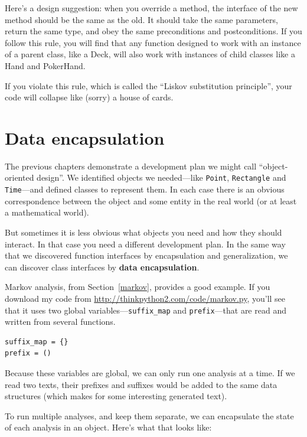 \documentclass[10pt]{book}
\begin{document}
Here's a design suggestion: when you override a method,
the interface of the new method should be the same as the old.  It
should take the same parameters, return the same type, and obey the
same preconditions and postconditions.  If you follow this rule, you
will find that any function designed to work with an instance of a
parent class, like a Deck, will also work with instances of child
classes like a Hand and PokerHand.

If you violate this rule, which is called the ``Liskov substitution
principle'', your code will collapse like (sorry) a house of cards.


\section{Data encapsulation}

The previous chapters demonstrate a development plan we might call
``object-oriented design''.  We identified objects we needed---like
{\tt Point}, {\tt Rectangle} and {\tt Time}---and defined classes to
represent them.  In each case there is an obvious correspondence
between the object and some entity in the real world (or at least a
mathematical world).  

But sometimes it is less obvious what objects you need
and how they should interact.  In that case you need a different
development plan.  In the same way that we discovered function
interfaces by encapsulation and generalization, we can discover
class interfaces by {\bf data encapsulation}.

Markov analysis, from Section~\ref{markov}, provides a good example.
If you download my code from \url{http://thinkpython2.com/code/markov.py},
you'll see that it uses two global variables---\verb"suffix_map" and
\verb"prefix"---that are read and written from several functions.

\begin{verbatim}
suffix_map = {}        
prefix = ()            
\end{verbatim}

Because these variables are global, we can only run one analysis at a
time.  If we read two texts, their prefixes and suffixes would be
added to the same data structures (which makes for some interesting
generated text).

To run multiple analyses, and keep them separate, we can encapsulate
the state of each analysis in an object.
Here's what that looks like:
\end{document}
